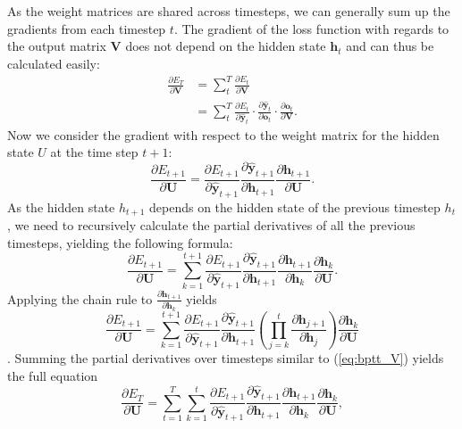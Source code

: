 \documentclass[12pt, a4paper, headinclude, twoside, plainheadsepline, open=right, numbers=noenddot, hidelinks, toc=listof, toc=bibliography]{scrreprt}
\begin{document}
As the weight matrices are shared across timesteps, we can generally sum up the gradients from each timestep $t$.
The gradient of the loss function with regards to the output matrix $\mathbf{V}$ does not depend on the hidden state $\mathbf{h}_t$ and can thus be calculated easily:
\begin{equation}
\label{eq:bptt_V}
\begin{split}
\frac{\partial E_T}{\partial \mathbf{V}} 
& = 
\sum_{t}^{T} \frac{\partial E_t}{\partial \mathbf{V}} \\
& =
\sum_{t}^{T} 
\frac{\partial E_t}{\partial \mathbf{\hat{y}}_t} 
\cdot 
\frac{\partial \mathbf{\hat{y}}_t}{\partial \mathbf{o}_t} 
\cdot 
\frac{\partial \mathbf{o}_t}{\partial \mathbf{V}}.
\end{split}
\end{equation}
Now we consider the gradient with respect to the weight matrix for the hidden state $U$ at the time step $t+1$:
\begin{equation}
\frac{\partial E_{t+1}}{\partial \mathbf{U}} = 
\frac{\partial E_{t+1}}{\partial \mathbf{\hat{y}}_{t+1}}
\frac{\partial \mathbf{\hat{y}}_{t+1}}{\partial \mathbf{h}_{t+1}}
\frac{\partial \mathbf{h}_{t+1}}{\partial \mathbf{U}}.
\end{equation}
As the hidden state $h_{t+1}$ depends on the hidden state of the previous timestep $h_t$, we need to recursively calculate the partial derivatives of all the previous timesteps, yielding the following formula:
\begin{equation}
\frac{\partial E_{t+1}}{\partial \mathbf{U}} = \sum_{k=1}^{t+1}
\frac{\partial E_{t+1}}{\partial \mathbf{\hat{y}}_{t+1}}
\frac{\partial \mathbf{\hat{y}}_{t+1}}{\partial \mathbf{h}_{t+1}}
\frac{\partial \mathbf{h}_{t+1}}{\partial \mathbf{h}_k}
\frac{\partial \mathbf{h}_k}{\partial \mathbf{U}}.
\end{equation}
Applying the chain rule to $\frac{\partial \mathbf{h}_{t+1}}{\partial \mathbf{h}_k}$ yields
\begin{equation}
\frac{\partial E_{t+1}}{\partial \mathbf{U}} = \sum_{k=1}^{t+1}
\frac{\partial E_{t+1}}{\partial \mathbf{\hat{y}}_{t+1}}
\frac{\partial \mathbf{\hat{y}}_{t+1}}{\partial \mathbf{h}_{t+1}}
\left(\prod_{j=k}^{t}\frac{\partial \mathbf{h}_{j+1}}{\partial \mathbf{h}_j}\right)
\frac{\partial \mathbf{h}_k}{\partial \mathbf{U}}
\end{equation}\cite{aratBackpropagationTimeRecurrent2019}.
Summing the partial derivatives over timesteps similar to (\ref{eq:bptt_V}) yields the full equation
\begin{equation}
\label{eq:bptt_U}
\frac{\partial E_T}{\partial \mathbf{U}} = 
\sum_{t=1}^{T}
\sum_{k=1}^{t}
\frac{\partial E_{t+1}}{\partial \mathbf{\hat{y}}_{t+1}}
\frac{\partial \mathbf{\hat{y}}_{t+1}}{\partial \mathbf{h}_{t+1}}
\frac{\partial \mathbf{h}_{t+1}}{\partial \mathbf{h}_k}
\frac{\partial \mathbf{h}_k}{\partial \mathbf{U}},
\end{equation}
\end{document}
